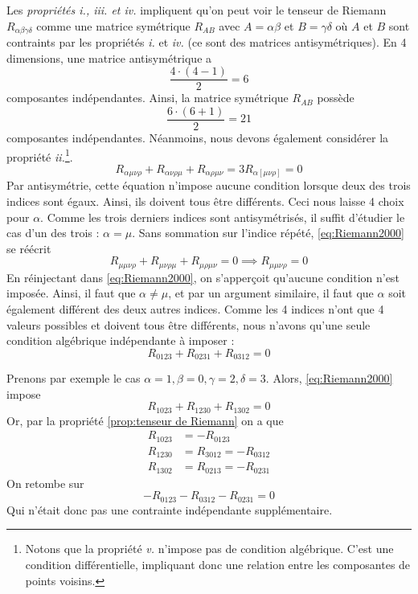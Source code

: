Les \textit{propriétés i., iii. et iv.} impliquent qu'on peut voir le tenseur de Riemann $R_{\alpha \beta \gamma \delta}$ comme une matrice symétrique $R_{AB}$ avec $A = \alpha \beta$ et $B = \gamma \delta$ où $A$ et $B$ sont contraints par les propriétés \emph{i.} et \emph{iv.} (ce sont des matrices antisymétriques). En 4 dimensions, une matrice antisymétrique a
\begin{equation*}
    \frac{4 \cdot (4-1)}{2} = 6
\end{equation*}
composantes indépendantes. Ainsi, la matrice symétrique $R_{AB}$ possède
\begin{equation*}
    \frac{6 \cdot (6+1)}{2} = 21
\end{equation*}
composantes indépendantes. Néanmoins, nous devons également considérer la propriété \emph{ii.}\footnote{Notons que la propriété \emph{v.} n'impose pas de condition algébrique. C'est une condition différentielle, impliquant donc une relation entre les composantes de points voisins.}.
\begin{equation}
    \label{eq:Riemann2000}
    R_{\alpha \mu \nu \rho} + R_{\alpha \nu \rho \mu} + R_{\alpha \rho \mu \nu}= 3 R_{\alpha[\mu\nu\rho]} = 0
\end{equation}
Par antisymétrie, cette équation n'impose aucune condition lorsque deux des trois indices sont égaux. Ainsi, ils doivent tous être différents. Ceci nous laisse 4 choix pour $\alpha$. Comme les trois derniers indices sont antisymétrisés, il suffit d'étudier le cas d'un des trois : $\alpha = \mu$. Sans sommation sur l'indice répété, \ref{eq:Riemann2000} se réécrit 
\begin{equation}
    R_{\mu\mu \nu\rho} + R_{\mu \nu \rho \mu}+ R_{\mu \rho \mu \nu}  = 0 \implies R_{\mu\mu \nu\rho} =0
\end{equation}
En réinjectant dans \ref{eq:Riemann2000}, on s'apperçoit qu'aucune condition n'est imposée. Ainsi, il faut que $\alpha \neq \mu$, et par un argument similaire, il faut que $\alpha$ soit également différent des deux autres indices. Comme les 4 indices n'ont que 4 valeurs possibles et doivent tous être différents, nous n'avons qu'une seule condition algébrique indépendante à imposer :
\begin{equation}
    R_{0123} + R_{0231} + R_{0312} = 0
\end{equation}
\begin{exmp}
    Prenons par exemple le cas $\alpha = 1, \beta =0, \gamma = 2, \delta = 3$. Alors, \ref{eq:Riemann2000} impose 
    \begin{equation}
        R_{1023} + R_{1230} + R_{1302} = 0
    \end{equation}
    Or, par la propriété \ref{prop:tenseur de Riemann} on a que
    \begin{align*}
        R_{1023} &= - R_{0123} \\
        R_{1230} &= R_{3012} = - R_{0312}\\
        R_{1302} &= R_{0213} = -R_{0231} 
    \end{align*}
    On retombe sur
    \begin{equation}
        - R_{0123} - R_{0312}-R_{0231}=0
    \end{equation}
    Qui n'était donc pas une contrainte indépendante supplémentaire.
\end{exmp}
